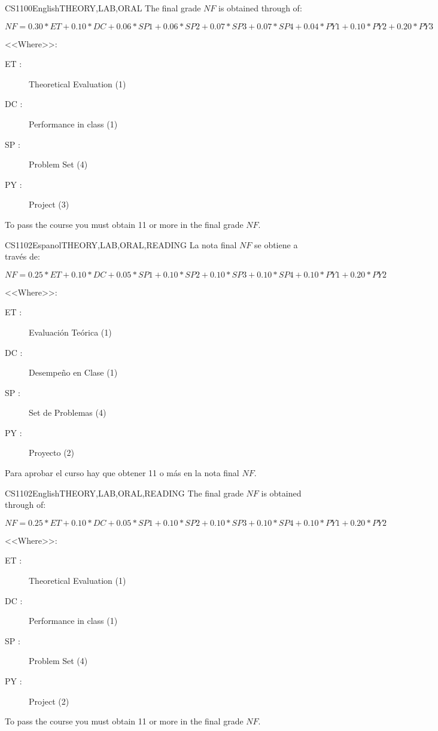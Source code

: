 \begin{evaluation}{CS1100}{English}{THEORY,LAB,ORAL}
The final grade $NF$ is obtained through of:

$ NF = 0.30*ET + 0.10*DC + 0.06*SP1 + 0.06*SP2 + 0.07*SP3 + 0.07*SP4 +0.04*PY1
 + 0.10*PY2 + 0.20*PY3 $

<<Where>>:
\begin{description}
  \item[ET :] Theoretical Evaluation (1)
  \item[DC :] Performance in class (1)
  \item[SP :] Problem Set (4)
  \item[PY :] Project (3)
\end{description}

	To pass the course you must obtain 11 or more in the final grade $NF$.
\end{evaluation}


\begin{evaluation}{CS1102}{Espanol}{THEORY,LAB,ORAL,READING}
La nota final $NF$ se obtiene a través de:

  $ NF = 0.25*ET + 0.10*DC + 0.05*SP1 + 0.10*SP2 + 0.10*SP3 + 0.10*SP4 +0.10*PY1
   + 0.20*PY2 $

<<Where>>:
  \begin{description}
		\item[ET :] Evaluación Teórica (1)
		\item[DC :] Desempeño en Clase (1)
    \item[SP :] Set de Problemas (4)
    \item[PY :] Proyecto (2)
	\end{description}

	Para aprobar el curso hay que obtener 11 o más en la nota final $NF$.
\end{evaluation}

\begin{evaluation}{CS1102}{English}{THEORY,LAB,ORAL,READING}
The final grade $NF$ is obtained through of:

$ NF = 0.25*ET + 0.10*DC + 0.05*SP1 + 0.10*SP2 + 0.10*SP3 + 0.10*SP4 +0.10*PY1
 + 0.20*PY2 $

<<Where>>:
\begin{description}
  \item[ET :] Theoretical Evaluation (1)
  \item[DC :] Performance in class (1)
  \item[SP :] Problem Set (4)
  \item[PY :] Project (2)
\end{description}

	To pass the course you must obtain 11 or more in the final grade $NF$.
\end{evaluation}


